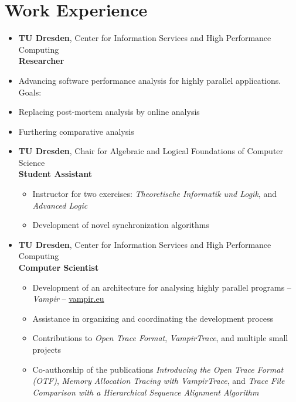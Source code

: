 



\pagestyle{empty}



\section*{Work Experience}
\begin{itemize}
	\item {}
		\textbf{TU Dresden}, Center for Information Services and High Performance Computing \\
		\textbf{Researcher}
		\item Advancing software performance analysis for highly parallel applications. Goals:
			\item \hspace{1em} Replacing post-mortem analysis by online analysis
			\item \hspace{1em} Furthering comparative analysis
	\item {}
		\textbf{TU Dresden}, Chair for Algebraic and Logical Foundations of Computer Science \\
		\textbf{Student Assistant}
		\begin{itemize}
			\item Instructor for two exercises: \textit{Theoretische Informatik und Logik}, and \textit{Advanced Logic}
			\item Development of novel synchronization algorithms
		\end{itemize}
	\item {}
		\textbf{TU Dresden}, Center for Information Services and High Performance Computing \\
		\textbf{Computer Scientist}
		\begin{itemize}
			\item Development of an architecture for analysing highly parallel programs -- \emph{Vampir} -- \href{http://www.vampir.eu}{vampir.eu}
			\item Assistance in organizing and coordinating the development process
			\item Contributions to \emph{Open Trace Format}, \emph{VampirTrace}, and multiple small projects
			\item Co-authorship of the publications \emph{Introducing the Open Trace Format (OTF)},
			\emph{Memory Allocation Tracing with VampirTrace}, and \emph{Trace File Comparison with a Hierarchical Sequence Alignment Algorithm}
		\end{itemize}
\end{itemize}

